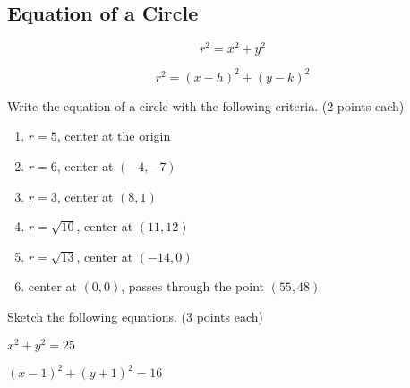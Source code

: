 \documentclass[12pt]{article}
\begin{document}
\pagebreak

\subsection*{Equation of a Circle}

$$r^2=x^2+y^2$$

$$r^2=(x-h)^2+(y-k)^2$$

Write the equation of a circle with the following criteria. (2 points each)\\

\begin{enumerate}[resume]

	\item $r=5$, center at the origin\\
	
	\item $r=6$, center at $(-4,-7)$\\
	
	\item $r=3$, center at $(8,1)$\\
	
	\item $r=\sqrt{10}$, center at $(11,12)$\\
	
	\item $r=\sqrt{13}$, center at $(-14,0)$\\
	
	\item center at $(0,0)$, passes through the point $(55,48)$\\
	
	
\end{enumerate}

\hrulefill

Sketch the following equations. (3 points each)\\

\begin{enumerate}[resume]
\begin{multicols}{2}

	\item $x^2+y^2=25$\\
	
	
	\item $(x-1)^2+(y+1)^2=16$\\
	

\end{multicols}
\end{enumerate}
\end{document}
